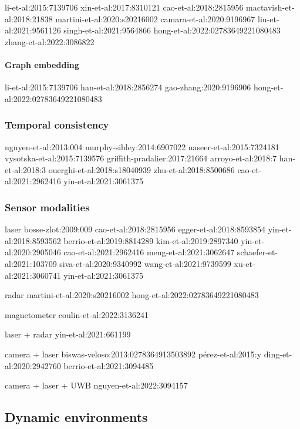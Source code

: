 li-et-al:2015:7139706
xin-et-al:2017:8310121
cao-et-al:2018:2815956
mactavish-et-al:2018:21838
martini-et-al:2020:s20216002
camara-et-al:2020:9196967
liu-et-al:2021:9561126
singh-et-al:2021:9564866
hong-et-al:2022:02783649221080483
zhang-et-al:2022:3086822


\paragraph{Graph embedding}

li-et-al:2015:7139706
han-et-al:2018:2856274
gao-zhang:2020:9196906
hong-et-al:2022:02783649221080483



\subsubsection{Temporal consistency}

nguyen-et-al:2013:004
murphy-sibley:2014:6907022
naseer-et-al:2015:7324181
vysotska-et-al:2015:7139576
griffith-pradalier:2017:21664
arroyo-et-al:2018:7
han-et-al:2018:3
ouerghi-et-al:2018:s18040939
zhu-et-al:2018:8500686
cao-et-al:2021:2962416
yin-et-al:2021:3061375



\subsubsection{Sensor modalities}

laser
bosse-zlot:2009:009
cao-et-al:2018:2815956
egger-et-al:2018:8593854
yin-et-al:2018:8593562
berrio-et-al:2019:8814289
kim-et-al:2019:2897340
yin-et-al:2020:2905046
cao-et-al:2021:2962416
meng-et-al:2021:3062647
schaefer-et-al:2021:103709
siva-et-al:2020:9340992
wang-et-al:2021:9739599
xu-et-al:2021:3060741
yin-et-al:2021:3061375

radar
martini-et-al:2020:s20216002
hong-et-al:2022:02783649221080483

magnetometer
coulin-et-al:2022:3136241

laser + radar
yin-et-al:2021:661199

camera + laser
biswas-veloso:2013:0278364913503892
pérez-et-al:2015:y
ding-et-al:2020:2942760
berrio-et-al:2021:3094485

camera + laser + UWB
nguyen-et-al:2022:3094157





\subsection{Dynamic environments}
\label{sec:discussion:dynamics}

